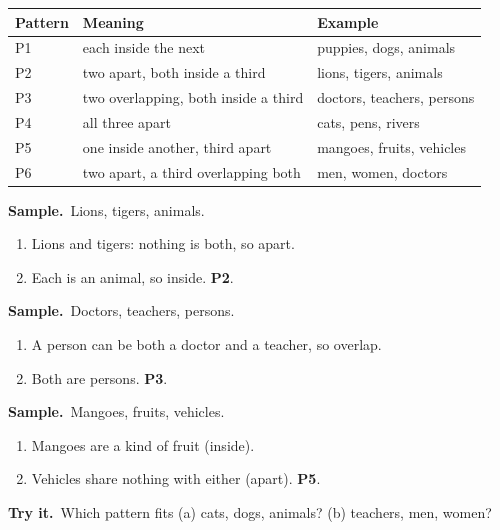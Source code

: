 \documentclass[11pt,a4paper]{article}
\newif\ifkeepsamp
\newcommand{\samp}{\ifkeepsamp\needspace{4\baselineskip}\fi\textbf{\color{ember}Sample.}\ }
\newcommand{\tryit}[1]{\textbf{\color{ember}Try it.}\ #1}
\begin{document}
\begin{center}\small\renewcommand{\arraystretch}{1.18}\setlength{\tabcolsep}{8pt}
\begin{tabularx}{\linewidth}{@{}l >{\raggedright\arraybackslash}X >{\raggedright\arraybackslash}X@{}}
\toprule
\textbf{\color{slate}Pattern} & \textbf{\color{slate}Meaning} & \textbf{\color{slate}Example} \\ \midrule
P1 & each inside the next & puppies, dogs, animals \\
P2 & two apart, both inside a third & lions, tigers, animals \\
P3 & two overlapping, both inside a third & doctors, teachers, persons \\
P4 & all three apart & cats, pens, rivers \\
P5 & one inside another, third apart & mangoes, fruits, vehicles \\
P6 & two apart, a third overlapping both & men, women, doctors \\
\bottomrule
\end{tabularx}\end{center}

\samp Lions, tigers, animals.
\begin{enumerate}
\item Lions and tigers: nothing is both, so apart.
\item Each is an animal, so inside. \textbf{P2}.
\end{enumerate}
\samp Doctors, teachers, persons.
\begin{enumerate}
\item A person can be both a doctor and a teacher, so overlap.
\item Both are persons. \textbf{P3}.
\end{enumerate}
\samp Mangoes, fruits, vehicles.
\begin{enumerate}
\item Mangoes are a kind of fruit (inside).
\item Vehicles share nothing with either (apart). \textbf{P5}.
\end{enumerate}

\tryit Which pattern fits (a) cats, dogs, animals? (b) teachers, men, women?
\end{document}

